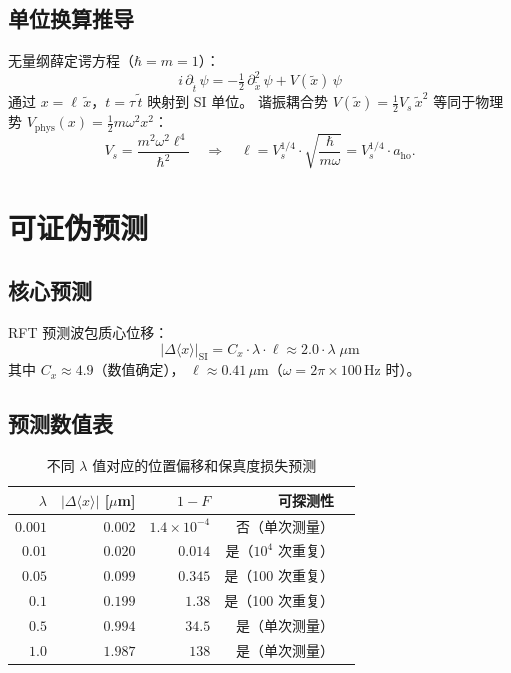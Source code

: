 \documentclass[a4paper,11pt]{article}
\begin{document}
\subsection{单位换算推导}

无量纲薛定谔方程（$\hbar = m = 1$）：
\[
  i\,\partial_{\tilde{t}}\,\psi = -\tfrac{1}{2}\,\partial_{\tilde{x}}^2\,\psi
  + V(\tilde{x})\,\psi
\]
通过 $x = \ell\,\tilde{x}$，$t = \tau\,\tilde{t}$ 映射到 SI 单位。
谐振耦合势 $V(\tilde{x}) = \tfrac{1}{2}V_s\,\tilde{x}^2$
等同于物理势 $V_{\mathrm{phys}}(x) = \tfrac{1}{2}m\omega^2 x^2$：
\[
  V_s = \frac{m^2\omega^2\ell^4}{\hbar^2}
  \quad\Longrightarrow\quad
  \ell = V_s^{1/4} \cdot \sqrt{\frac{\hbar}{m\omega}} = V_s^{1/4} \cdot a_{\mathrm{ho}}.
\]

\section{可证伪预测}

\subsection{核心预测}

RFT 预测波包质心位移：
\[
  \boxed{|\Delta\langle x\rangle|_{\mathrm{SI}}
  = C_x \cdot \lambda \cdot \ell
  \approx 2{.}0 \cdot \lambda\;\mu\mathrm{m}}
\]
其中 $C_x \approx 4{.}9$（数值确定），
$\ell \approx 0{.}41\,\mu\mathrm{m}$（$\omega = 2\pi \times 100\,\mathrm{Hz}$ 时）。

\subsection{预测数值表}

\begin{table}[h]
\centering
\caption{不同 $\lambda$ 值对应的位置偏移和保真度损失预测}
\begin{tabular}{rrrrl}
\toprule
$\lambda$ & $|\Delta\langle x\rangle|$ [$\mu$m] & $1 - F$ & 可探测性 \\
\midrule
$0{.}001$ & $0{.}002$ & $1{.}4 \times 10^{-4}$ & 否（单次测量） \\
$0{.}01$  & $0{.}020$ & $0{.}014$               & 是（$10^4$ 次重复） \\
$0{.}05$  & $0{.}099$ & $0{.}345$               & 是（100 次重复） \\
$0{.}1$   & $0{.}199$ & $1{.}38$                & 是（100 次重复） \\
$0{.}5$   & $0{.}994$ & $34{.}5$                & 是（单次测量） \\
$1{.}0$   & $1{.}987$ & $138$                   & 是（单次测量） \\
\bottomrule
\end{tabular}
\end{table}
\end{document}
